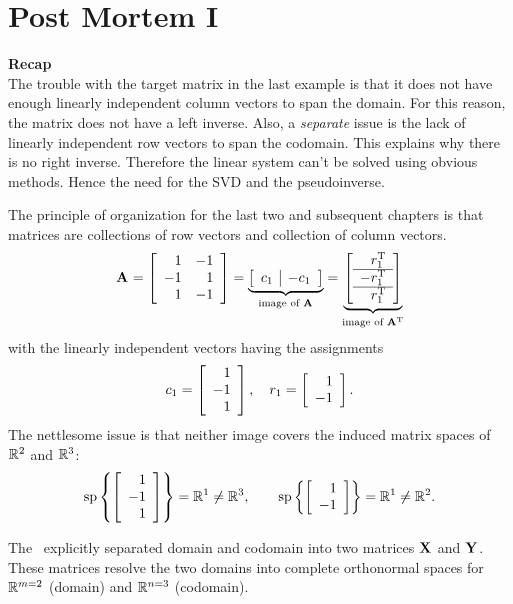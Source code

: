 \chapter{Post Mortem I}

\textbf{Recap}\\
The trouble with the target matrix in the last example is that it does not have enough linearly independent column vectors to span the domain. For this reason, the matrix does not have a left inverse. Also, a \textit{separate} issue is the lack of linearly independent row vectors to span the codomain. This explains why there is no right inverse. Therefore the linear system can't be solved using obvious methods. Hence the need for the SVD and the pseudoinverse.

The principle of organization for the last two and subsequent chapters is that matrices are collections of row vectors and collection of column vectors. 
\begin{equation}
  \A{}=\Aexample = \underbrace{\mat{c|c}{c_{1} & -c_{1}}}_{\text{image of }\A{}}=\underbrace{\mat{r}{r_{1}^{\mathrm{T}}\\\hline-r_{1}^{\mathrm{T}}\\\hline r_{1}^{\mathrm{T}}}}_{\text{image of }\A{T}}
\end{equation}
with the linearly independent vectors having the assignments
\begin{equation}
  c_{1}=\mat{r}{1\\-1\\1}, \quad r_{1}=\mat{r}{1\\-1}.
\end{equation}
The nettlesome issue is that neither image covers the induced matrix spaces of $\real{2}$ and $\real{3}$:
\begin{equation}
  \spn\lst{\mat{r}{1\\-1\\1}}=\real{1}\ne\real{3}, \qquad \spn\lst{\mat{r}{1\\-1}}=\real{1}\ne\real{2}.
\end{equation}

The \svdl \ explicitly separated domain and codomain into two matrices $\X{}$ and $\Y{}$. These matrices resolve the two domains into complete orthonormal spaces for $\real{m=2}$ (domain) and $\real{n=3}$ (codomain).
 
